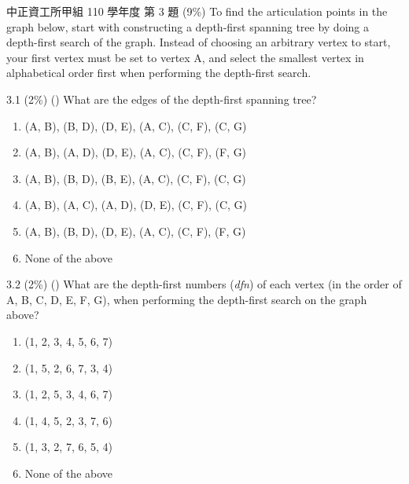 \begin{pastexam}[label={px:con-4}]{中正資工所甲組 110 學年度 第 3 題}
(9\%) To find the articulation points in the graph below, start with constructing a depth-first spanning tree by doing a depth-first search of the graph. Instead of choosing an arbitrary vertex to start, your first vertex must be set to vertex A, and select the smallest vertex in alphabetical order first when performing the depth-first search.

\begin{center}
\end{center}

3.1 (2\%) (\quad) What are the edges of the depth-first spanning tree?
\begin{enumerate}[label=(\alph*)]
\item (A, B), (B, D), (D, E), (A, C), (C, F), (C, G)
\item (A, B), (A, D), (D, E), (A, C), (C, F), (F, G)
\item (A, B), (B, D), (B, E), (A, C), (C, F), (C, G)
\item (A, B), (A, C), (A, D), (D, E), (C, F), (C, G)
\item (A, B), (B, D), (D, E), (A, C), (C, F), (F, G)
\item None of the above
\end{enumerate}

3.2 (2\%) (\quad) What are the depth-first numbers (\textit{dfn}) of each vertex (in the order of A, B, C, D, E, F, G), when performing the depth-first search on the graph above?
\begin{enumerate}[label=(\alph*)]
\item (1, 2, 3, 4, 5, 6, 7)
\item (1, 5, 2, 6, 7, 3, 4)
\item (1, 2, 5, 3, 4, 6, 7)
\item (1, 4, 5, 2, 3, 7, 6)
\item (1, 3, 2, 7, 6, 5, 4)
\item None of the above
\end{enumerate}


\end{pastexam}
